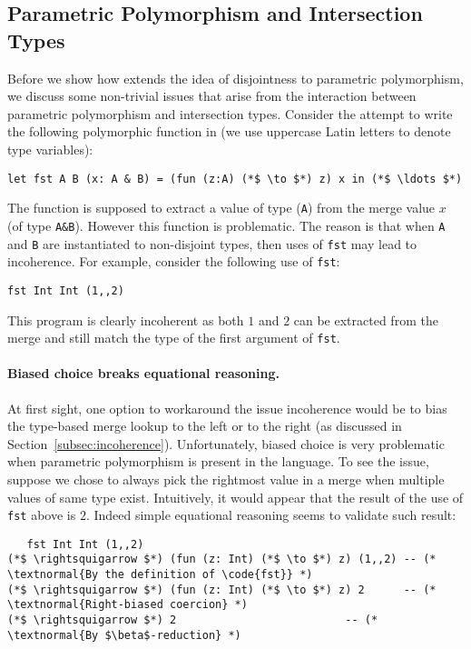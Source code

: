 \subsection{Parametric Polymorphism and Intersection Types}\label{subsec:polymorphism}
Before we show how \namedis extends the idea of disjointness to parametric
polymorphism, we discuss some non-trivial issues that arise from
the interaction between parametric polymorphism and intersection types.
Consider the attempt to write
the following polymorphic function in \namedis (we use
uppercase Latin letters to denote type variables):
\begin{lstlisting}
let fst A B (x: A & B) = (fun (z:A) (*$ \to $*) z) x in (*$ \ldots $*)
\end{lstlisting}
The
 function is supposed to extract a value of type
(\lstinline{A}) from the merge value $x$ (of type \lstinline{A&B}). However
this function is problematic.  The reason is that when
\lstinline{A} and \lstinline{B} are instantiated to non-disjoint
types, then uses of \lstinline{fst} may lead to incoherence.
For example, consider the following use of \lstinline{fst}:
\begin{lstlisting}
fst Int Int (1,,2)
\end{lstlisting}
\noindent This program is clearly incoherent as both
$1$ and $2$ can be extracted from the merge and still match the type
of the first argument of \lstinline{fst}.

\paragraph{Biased choice breaks equational reasoning.} At first sight, one option
to workaround the issue incoherence would be to bias the type-based merge lookup
to the left or to the right (as discussed in
Section~\ref{subsec:incoherence}). Unfortunately, biased choice is
very problematic when parametric polymorphism is present in the language.
To see the issue, suppose we chose to always pick the
rightmost value in a merge when multiple values of same type exist.
Intuitively, it would appear that the result of the use of
\lstinline{fst} above is $2$. Indeed simple equational reasoning
seems to validate such result:
\begin{lstlisting}
   fst Int Int (1,,2)
(*$ \rightsquigarrow $*) (fun (z: Int) (*$ \to $*) z) (1,,2) -- (* \textnormal{By the definition of \code{fst}} *)
(*$ \rightsquigarrow $*) (fun (z: Int) (*$ \to $*) z) 2      -- (* \textnormal{Right-biased coercion} *)
(*$ \rightsquigarrow $*) 2                          -- (* \textnormal{By $\beta$-reduction} *)
\end{lstlisting}

